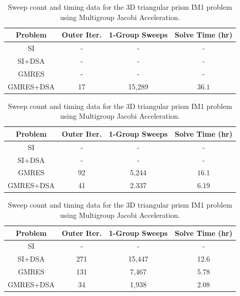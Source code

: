 \begin{table}
\caption{Sweep count and timing data for the 3D triangular prism IM1 problem using Two-Grid Acceleration.}
\centering
\def\arraystretch{1.25}
\begin{tabular}{|c|c|c|c|}
\hline
Problem & Outer Iter.  & 1-Group Sweeps & Solve Time (hr)  \\
\hline \hline
SI & - & -  & -  \\ \hline
SI+DSA & -  & - & -  \\ \hline
GMRES & -  & - & - \\ \hline
{GMRES+DSA} & {17} &  {15,289}  &  {$36.1$}  \\ \hline
\end{tabular}
\label{tab::IM1_3Dtriangle_TG}
\vspace{1.5cm}
\caption{Sweep count and timing data for the 3D triangular prism IM1 problem using Modified Two-Grid Acceleration.}
\centering
\def\arraystretch{1.25}
\begin{tabular}{|c|c|c|c|}
\hline
Problem & Outer Iter.  & 1-Group Sweeps & Solve Time (hr)  \\
\hline \hline
SI & - &  - & -  \\ \hline
SI+DSA & -  & - & -  \\ \hline
{GMRES} & {92}  & {5,244 }& {$16.1$} \\ \hline
GMRES+DSA & 41 &  2.337  &  6.19  \\ \hline
\end{tabular}
\label{tab::IM1_3Dtriangle_MTG}
\vspace{1.5cm}
\caption{Sweep count and timing data for the 3D triangular prism IM1 problem using Multigroup Jacobi Acceleration.}
\centering
\def\arraystretch{1.25}
\begin{tabular}{|c|c|c|c|}
\hline
Problem & Outer Iter.  & 1-Group Sweeps & Solve Time (hr)  \\
\hline \hline
SI &  - & - & -  \\ \hline
SI+DSA & 271 &  15,447 & 12.6 \\ \hline
{GMRES} & {131} & {7,467} & {5.78} \\ \hline
{GMRES+DSA} & {34}& {1,938} & {2.08} \\ \hline
\end{tabular}
\label{tab::IM1_3Dtriangle_MJA}
\end{table}

